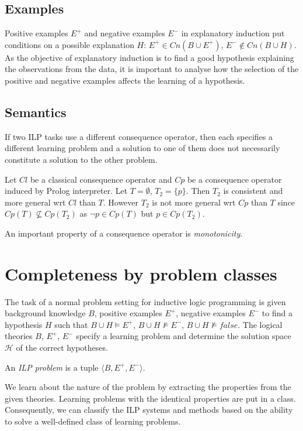\subsection{Examples}
Positive examples $E^{+}$ and negative examples $E^{-}$ in explanatory induction put conditions on a possible explanation $H$: $E^{+} \in Cn(B \cup E^{+})$, $E^{-} \not \in Cn(B \cup H)$. As the objective of explanatory induction is to find a good hypothesis explaining the observations from the data, it is important to analyse how the selection of the positive and negative examples affects the learning of a hypothesis.

\subsection{Semantics}
If two ILP tasks use a different consequence operator, then each specifies a different learning problem and a solution to one of them does not necessarily constitute a solution to the other problem.

\begin{exmp}
Let $Cl$ be a classical consequence operator and $Cp$ be a consequence operator induced by Prolog interpreter. Let $T=\emptyset$, $T_2=\{p\}$.
Then $T_2$ is consistent and more general wrt $Cl$ than $T$. However $T_2$ is not more general wrt $Cp$ than $T$ since $Cp(T) \not\subseteq Cp(T_2)$ as $\neg p \in Cp(T)$ but $p \in Cp(T_2)$.
\end{exmp}

An important property of a consequence operator is \emph{monotonicity}.

\section{Completeness by problem classes}
The task of a normal problem setting for inductive logic programming is given background knowledge $B$, positive examples $E^{+}$, negative examples $E^{-}$ to find a hypothesis $H$ such that $B \cup H \models E^{+}$,
$B \cup H \not\models E^{-}$,
$B \cup H \not\models false$.
The logical theories $B$, $E^{+}$, $E^{-}$ specify a learning problem and determine the solution space $\mathcal{H}$ of the correct hypotheses.

\begin{defn}
An \emph{ILP problem} is a tuple $\langle B, E^{+}, E^{-} \rangle$.
\end{defn}

We learn about the nature of the problem by extracting the properties from the given theories. Learning problems with the identical properties are put in a class. Consequently, we can classify the ILP systems and methods based on the ability to solve a well-defined class of learning problems.

